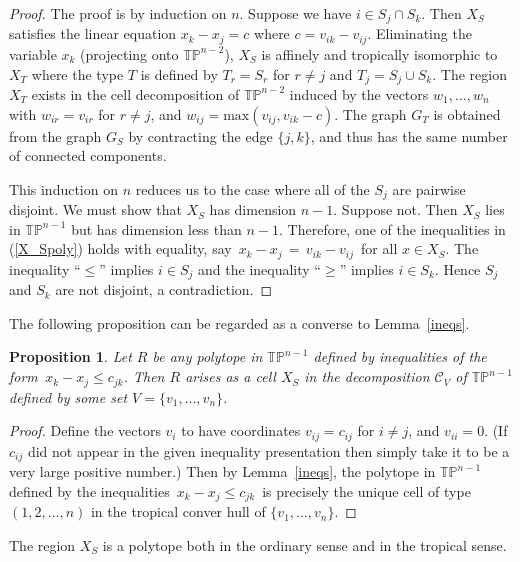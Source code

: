 \documentclass[11pt]{amsart}
\newtheorem{prop}[thm]{Proposition}
\newcommand{\TP}{\mathbb{TP}}
\begin{document}
\begin{proof}
The proof is by induction on $n$. 
Suppose we have $i\in S_j\cap S_k$. Then $X_S$ satisfies the linear
equation $x_k-x_j = c$ where $c=v_{ik}-v_{ij}$. 
Eliminating the variable $x_k$ (projecting
onto $\TP^{n-2}$), $X_S$ is affinely and tropically isomorphic to 
$X_T$ where the type $T$ is defined by  $T_r  = S_r$ for
$r\neq j$ and $T_j = S_j\cup S_k$. The region $X_T$ exists in the 
cell decomposition of $\TP^{n-2}$ induced by the vectors
$w_1,\ldots,w_n$ with  $w_{ir} = v_{ir}$ for $r\neq j$, 
and $w_{ij} = \text{max}(v_{ij}, v_{ik}-c)$. 
The graph $G_T$ is 
obtained from the graph $G_S$ by contracting the edge 
$\{j,k\}$, and thus has the same number of 
connected components.

This induction on $n$ reduces us to the case where all of the $S_j$ are pairwise disjoint. We must show that  $X_S$ has dimension $n-1$.
Suppose not. Then $X_S$ lies in $\TP^{n-1}$ but has dimension less than
$n-1$. Therefore, one of the inequalities in  (\ref{X_Spoly}) holds with 
equality, say
$\, x_k - x_j \, = \, v_{ik} - v_{ij} \,$ for all $x \in X_S$. The inequality
``$\leq $'' implies $i \in S_j$ and the inequality
``$\geq $'' implies $i \in S_k$. Hence $S_j$ and $S_k$
are not disjoint, a contradiction.
\end{proof}

The following proposition can be regarded as a converse to
Lemma~\ref{ineqs}.

\begin{prop}\label{convineqs}
Let $R$ be any polytope in $\TP^{n-1}$ 
defined by inequalities of the form $\,x_k-x_j\le c_{jk}$.
Then $R$ arises as a cell $X_S$ in the decomposition ${\mathcal C}_V$
of  $\TP^{n-1}$ defined by some set $V = \{v_1,\ldots,v_n\}$.
\end{prop}

\begin{proof}
Define the vectors $v_i$ to have coordinates $v_{ij} = c_{ij}$ for $i\neq j$, 
and $v_{ii} = 0$. (If $c_{ij}$ did not appear in the given inequality
presentation then simply take it to be a very large positive number.)
Then by Lemma~\ref{ineqs}, the polytope in $\TP^{n-1}$ defined by
the inequalities $\, x_k-x_j\le c_{jk} \,$ is
precisely the unique cell of type $(1,2,\ldots,n)$ in the tropical 
conver hull of  $\{v_1,\ldots,v_n\}$.
\end{proof}

The region $X_S$ is a polytope both in the
ordinary sense and in the tropical sense.
\end{document}
